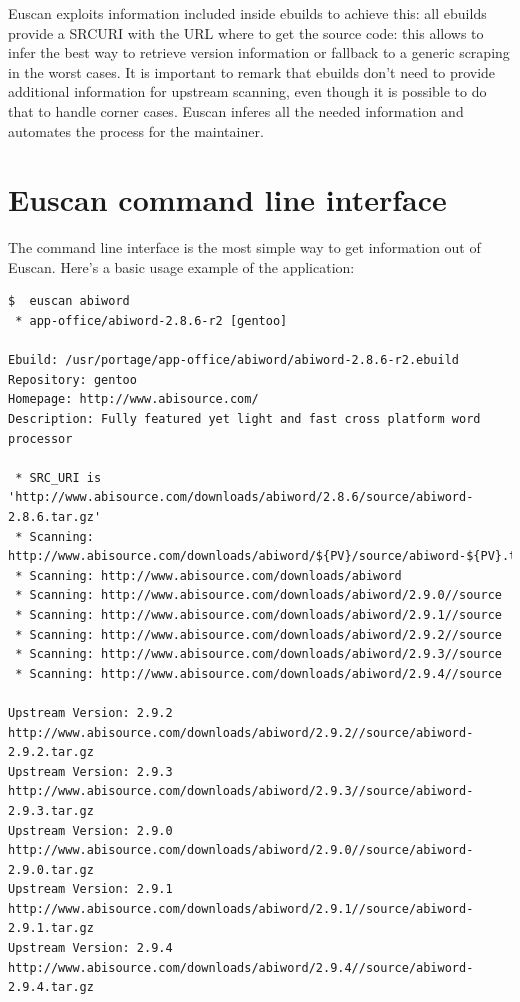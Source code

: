 Euscan exploits information included inside ebuilds to achieve this: all ebuilds provide a SRC\textunderscore URI with the URL where to get the source code: this allows to infer the best way to retrieve version information or fallback to a generic scraping in the worst cases.
It is important to remark that ebuilds don't need to provide additional information for upstream scanning, even though it is possible to do that to handle corner cases. Euscan inferes all the needed information and automates the process for the maintainer.


\section{Euscan command line interface}
The command line interface is the most simple way to get information out of Euscan. Here’s a basic usage example of the application:

\vspace{0.5cm}
\lstset{caption=Example of Euscan usage, label=Euscan example, numbers=none, frame=none, breaklines=true}
\begin{lstlisting}
$  euscan abiword
 * app-office/abiword-2.8.6-r2 [gentoo]

Ebuild: /usr/portage/app-office/abiword/abiword-2.8.6-r2.ebuild
Repository: gentoo
Homepage: http://www.abisource.com/
Description: Fully featured yet light and fast cross platform word processor

 * SRC_URI is 'http://www.abisource.com/downloads/abiword/2.8.6/source/abiword-2.8.6.tar.gz'
 * Scanning: http://www.abisource.com/downloads/abiword/${PV}/source/abiword-${PV}.tar.gz
 * Scanning: http://www.abisource.com/downloads/abiword
 * Scanning: http://www.abisource.com/downloads/abiword/2.9.0//source
 * Scanning: http://www.abisource.com/downloads/abiword/2.9.1//source
 * Scanning: http://www.abisource.com/downloads/abiword/2.9.2//source
 * Scanning: http://www.abisource.com/downloads/abiword/2.9.3//source
 * Scanning: http://www.abisource.com/downloads/abiword/2.9.4//source

Upstream Version: 2.9.2  http://www.abisource.com/downloads/abiword/2.9.2//source/abiword-2.9.2.tar.gz
Upstream Version: 2.9.3  http://www.abisource.com/downloads/abiword/2.9.3//source/abiword-2.9.3.tar.gz
Upstream Version: 2.9.0  http://www.abisource.com/downloads/abiword/2.9.0//source/abiword-2.9.0.tar.gz
Upstream Version: 2.9.1  http://www.abisource.com/downloads/abiword/2.9.1//source/abiword-2.9.1.tar.gz
Upstream Version: 2.9.4  http://www.abisource.com/downloads/abiword/2.9.4//source/abiword-2.9.4.tar.gz
\end{lstlisting}
\vspace{0.5cm}

